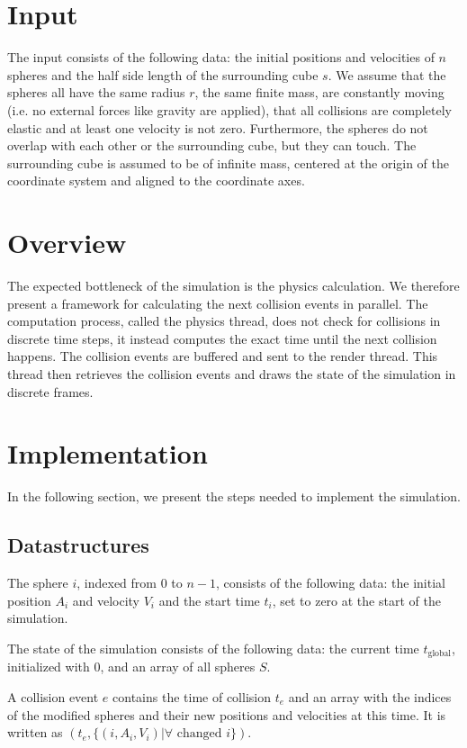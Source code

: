 \documentclass[journal, letterpaper]{IEEEtran}
\begin{document}
\section{Input}
The input consists of the following data: the initial positions and velocities of $n$ spheres and the half side length of the surrounding cube $s$.
We assume that the spheres all have the same radius $r$, the same finite mass, are constantly moving (i.e. no external forces like gravity are applied), that all collisions are completely elastic and at least one velocity is not zero. Furthermore, the spheres do not overlap with each other or the surrounding cube, but they can touch. The surrounding cube is assumed to be of infinite mass, centered at the origin of the coordinate system and aligned to the coordinate axes.

\section{Overview}
The expected bottleneck of the simulation is the physics calculation. We therefore present a framework for calculating the next collision events in parallel. 
The computation process, called the physics thread, does not check for collisions in discrete time steps, it instead computes the exact time until the next collision happens. The collision events are buffered and sent to the render thread. This thread then retrieves the collision events and draws the state of the simulation in discrete frames.

\section{Implementation}
In the following section, we present the steps needed to implement the simulation.

\subsection{Datastructures}
The sphere $i$, indexed from $0$ to $n-1$, consists of the following data: the initial position $A_i$ and velocity $V_i$ and the start time $t_i$, set to zero at the start of the simulation.

The state of the simulation consists of the following data: the current time $t_\text{global}$, initialized with 0, and an array of all spheres $S$.

A collision event $e$ contains the time of collision $t_e$ and an array with the indices of the modified spheres and their new positions and velocities at this time. It is written as $(t_e, \{(i, A_i, V_i) | \forall \text{ changed } i\})$.
\end{document}

